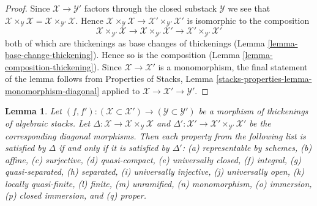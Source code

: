 \documentclass{stacks-project}
\theoremstyle{plain}
\newtheorem{lemma}[subsection]{Lemma}
\theoremstyle{definition}
\theoremstyle{remark}
\numberwithin{equation}{subsection}
\begin{document}
\begin{proof}
Since $\mathcal{X} \to \mathcal{Y}'$ factors through the closed
substack $\mathcal{Y}$ we see that
$\mathcal{X} \times_\mathcal{Y} \mathcal{X} =
\mathcal{X} \times_{\mathcal{Y}'} \mathcal{X}$.
Hence
$\mathcal{X} \times_\mathcal{Y} \mathcal{X} \to
\mathcal{X}' \times_{\mathcal{Y}'} \mathcal{X}'$
is isomorphic to the composition
$$
\mathcal{X} \times_{\mathcal{Y}'} \mathcal{X} \to
\mathcal{X} \times_{\mathcal{Y}'} \mathcal{X}' \to
\mathcal{X}' \times_{\mathcal{Y}'} \mathcal{X}'
$$
both of which are thickenings as base changes of thickenings
(Lemma \ref{lemma-base-change-thickening}).
Hence so is the composition
(Lemma \ref{lemma-composition-thickening}).
Since $\mathcal{X} \to \mathcal{X}'$ is a monomorphism,
the final statement of the lemma follows from
Properties of Stacks, Lemma
\ref{stacks-properties-lemma-monomorphism-diagonal}
applied to $\mathcal{X} \to \mathcal{X}' \to \mathcal{Y}'$.
\end{proof}

\begin{lemma}
\label{lemma-thickening-diagonals}
Let $(f, f') : (\mathcal{X} \subset \mathcal{X}') \to
(\mathcal{Y} \subset \mathcal{Y}')$ be a morphism of thickenings
of algebraic stacks.
Let $\Delta : \mathcal{X} \to \mathcal{X} \times_\mathcal{Y} \mathcal{X}$ and
$\Delta' : \mathcal{X}' \to \mathcal{X}' \times_{\mathcal{Y}'} \mathcal{X}'$
be the corresponding diagonal morphisms.
Then each property from the following list is satisfied by $\Delta$ if
and only if it is satisfied by $\Delta'$:
(a) representable by schemes, (b) affine, (c) surjective, (d) quasi-compact,
(e) universally closed, (f) integral, (g) quasi-separated, (h) separated,
(i) universally injective, (j) universally open, (k) locally quasi-finite,
(l) finite, (m) unramified, (n) monomorphism, (o) immersion,
(p) closed immersion, and (q) proper.
\end{lemma}
\end{document}
